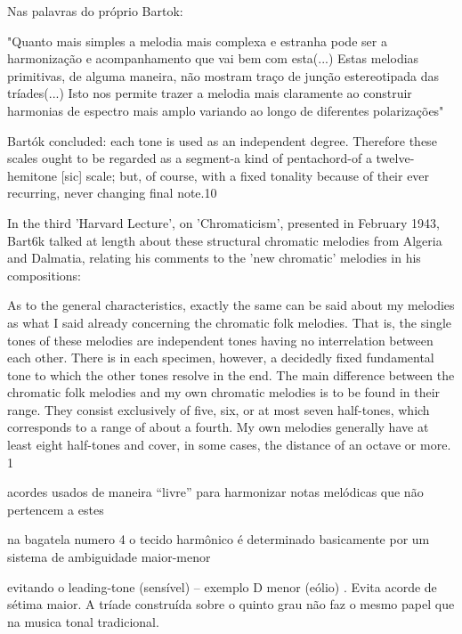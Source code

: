 \documentclass[
	12pt,				%
	openright,			%
	twoside,			%
	a4paper,			%
	english,			%
	french,				%
	spanish,			%
	brazil				%
	]{abntex2}
\begin{document}
Nas palavras do próprio Bartok:

\begin{citacao}
"Quanto mais simples a melodia mais complexa e estranha pode ser a harmonização e acompanhamento que vai bem com esta(...) Estas melodias primitivas, de alguma maneira, não mostram traço de junção estereotipada das tríades(...) Isto nos permite trazer a melodia mais claramente ao construir harmonias de espectro mais amplo variando ao longo de diferentes polarizações"
\cite[p. 342]{bartok1993bela}
\end{citacao}


Bartók concluded:
each tone is used as an independent degree. Therefore these scales ought to be regarded as a segment-a kind of
pentachord-of a twelve-hemitone [sic] scale; but, of course, with a fixed tonality because of their ever
recurring, never changing final note.10

In the third 'Harvard Lecture', on 'Chromaticism', presented in February 1943,
Bart6k talked at length about these structural chromatic melodies from Algeria and
Dalmatia, relating his comments to the 'new chromatic' melodies in his compositions:

As to the general characteristics, exactly the same can be said about my melodies as what I said already
concerning the chromatic folk melodies. That is, the single tones of these melodies are independent tones
having no interrelation between each other. There is in each specimen, however, a decidedly fixed
fundamental tone to which the other tones resolve in the end. The main difference between the chromatic folk
melodies and my own chromatic melodies is to be found in their range. They consist exclusively of five, six, or
at most seven half-tones, which corresponds to a range of about a fourth. My own melodies generally have at
least eight half-tones and cover, in some cases, the distance of an octave or more. 1
\cite[ p.6]{gillies1983bartok}










acordes usados de maneira “livre” para harmonizar notas melódicas que não pertencem a estes

na bagatela numero 4 o tecido harmônico é determinado basicamente por um sistema de ambiguidade maior-menor 

evitando o leading-tone (sensível) – exemplo D menor (eólio) . Evita acorde de sétima maior. 
A tríade construída sobre o quinto grau não faz o mesmo papel que na musica tonal tradicional.
\end{document}
